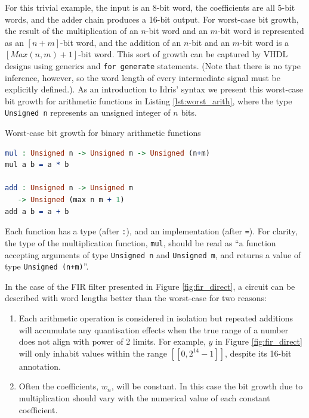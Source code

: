\documentclass[conference]{IEEEtran}
\begin{document}

For this trivial example, the input is an 8-bit word, the coefficients are all
5-bit words, and the adder chain produces a 16-bit output. For worst-case bit
growth, the result of the multiplication of an $n$-bit word and an $m$-bit word
is represented as an $[n+m]$-bit word, and the addition of an $n$-bit and an
$m$-bit word is a $[Max(n,m)+1]$-bit word. This sort of growth can be captured
by VHDL designs using generics and \texttt{for generate} statements. (Note that
there is no type inference, however, so the word length of every intermediate
signal must be explicitly defined.). As an introduction to Idris' syntax we
present this worst-case bit growth for arithmetic functions in Listing
\ref{lst:worst_arith}, where the type \texttt{Unsigned n} represents an unsigned
integer of $n$ bits.

\begin{codefig}[h]
  \caption{Worst-case bit growth for binary arithmetic functions}
\begin{lstlisting}[language=idris]
mul : Unsigned n -> Unsigned m -> Unsigned (n+m)
mul a b = a * b

add : Unsigned n -> Unsigned m
   -> Unsigned (max n m + 1)
add a b = a + b
\end{lstlisting}
\label{lst:worst_arith}
\end{codefig}

Each function has a type (after \texttt{:}), and an implementation (after \texttt{=}).
For clarity, the type of the multiplication function, \texttt{mul}, should be
read as ``a function accepting arguments of type \texttt{Unsigned n} and
\texttt{Unsigned m}, and returns a value of type \texttt{Unsigned (n+m)}''.

In the case of the FIR filter presented in Figure \ref{fig:fir_direct}, a circuit can be described with word lengths better than the worst-case for two reasons:

\begin{enumerate}
\item Each arithmetic operation is considered in isolation but repeated
  additions will accumulate any quantisation effects when the true range of a
  number does not align with power of 2 limits. For example, $y$ in Figure
  \ref{fig:fir_direct} will only inhabit values within the range
  $[\![0,2^{14}-1]\!]$, despite its 16-bit annotation.
\item Often the coefficients, $w_n$, will be constant. In this case the bit
  growth due to multiplication should vary with the numerical value of each
  constant coefficient.
\end{enumerate}
\end{document}
